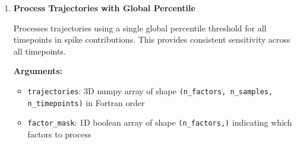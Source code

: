 \documentclass[11pt]{article}
\begin{document}
\begin{enumerate}
\begin{enumerate}
\begin{itemize}
\begin{itemize}
	      	      	      	\item \texttt{outliers\_spike}: Outliers for spike contributions
	      	      	      	      \texttt{[n\_timepoints, n\_samples, n\_processed\_factors]} (boolean)
	      	      	      \end{itemize}
	      	      \end{itemize}
	      	      \begin{lstlisting}[language=Python, caption={Complete Trajectory Processing with Per-Timepoint Thresholds}]
results = tox_process_trajectories(
    trajectories, factor_mask, dependent_idx, mode, percentile
)

# Access results
integrated_contribs = results['integrated_contribs']        
# [n_samples, n_processed]

spike_contribs = results['spike_contribs']                  
# [n_timepoints, n_samples, n_processed]

thresholds_integrated = results['thresholds_integrated']    
# [n_processed]

thresholds_spike = results['thresholds_spike']              
# [n_timepoints, n_processed]

outliers_integrated = results['outliers_integrated']        
# [n_samples, n_processed] (bool)

outliers_spike = results['outliers_spike']                  
# [n_timepoints, n_samples, n_processed] (bool)
	      	      \end{lstlisting}
	      	      
	      	\item \textbf{Process Trajectories with Global Percentile}
	      	      
	      	      Processes trajectories using a single global percentile threshold for all
	      	      timepoints in spike contributions. This provides consistent
	      	      sensitivity across all timepoints.
	      	      
	      	      \textbf{Arguments:}
	      	      \begin{itemize}
	      	      	\item \texttt{trajectories}: 3D numpy array of shape \texttt{(n\_factors,
	      	      	      n\_samples, n\_timepoints)} in Fortran order
	      	      	
	      	      	\item \texttt{factor\_mask}: 1D boolean array of shape \texttt{(n\_factors,)}
	      	      	      indicating which factors to process
	      	      	      

\end{itemize}
\end{enumerate}
\end{enumerate}
\end{document}
